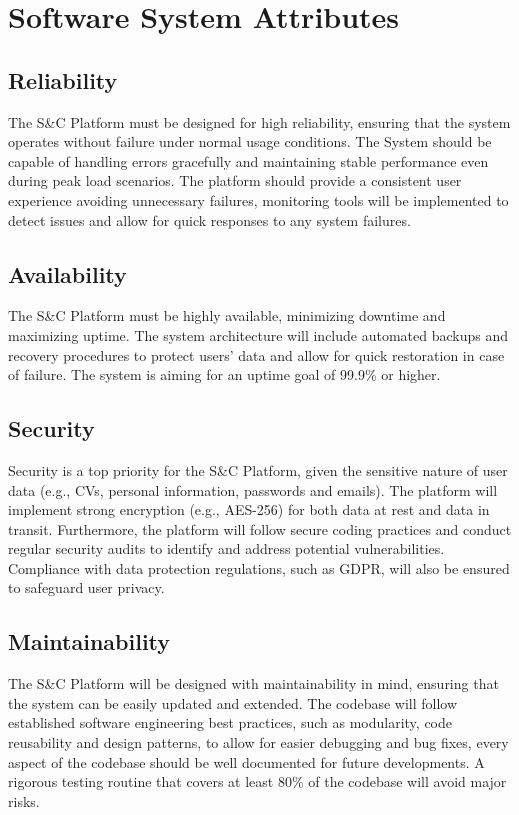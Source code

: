 \section{Software System Attributes}

\subsection{Reliability}
The S\&C Platform must be designed for high reliability, 
ensuring that the system operates without failure under normal usage conditions. 
The System should be capable of handling errors gracefully and maintaining stable performance even during peak load scenarios. 
The platform should provide a consistent user experience avoiding unnecessary failures, 
monitoring tools will be implemented to detect issues and allow for quick responses to any system failures.

\subsection{Availability}
The S\&C Platform must be highly available, 
minimizing downtime and maximizing uptime. 
The system architecture will include automated backups and recovery procedures to protect users' data 
and allow for quick restoration in case of failure. 
The system is aiming for an uptime goal of 99.9\% or higher.

\subsection{Security}
Security is a top priority for the S\&C Platform, 
given the sensitive nature of user data (e.g., CVs, personal information, passwords and emails). 
The platform will implement strong encryption (e.g., AES-256) 
for both data at rest and data in transit. 
Furthermore, the platform will follow secure coding practices 
and conduct regular security audits to identify and address potential vulnerabilities. 
Compliance with data protection regulations, such as GDPR, will also be ensured to safeguard user privacy.

\subsection{Maintainability}
The S\&C Platform will be designed with maintainability in mind, 
ensuring that the system can be easily updated and extended. 
The codebase will follow established software engineering best practices, 
such as modularity, code reusability and design patterns, to allow for easier debugging and bug fixes, 
every aspect of the codebase should be well documented for future developments.  
A rigorous testing routine that covers at least 80\% of the codebase will avoid major risks.

